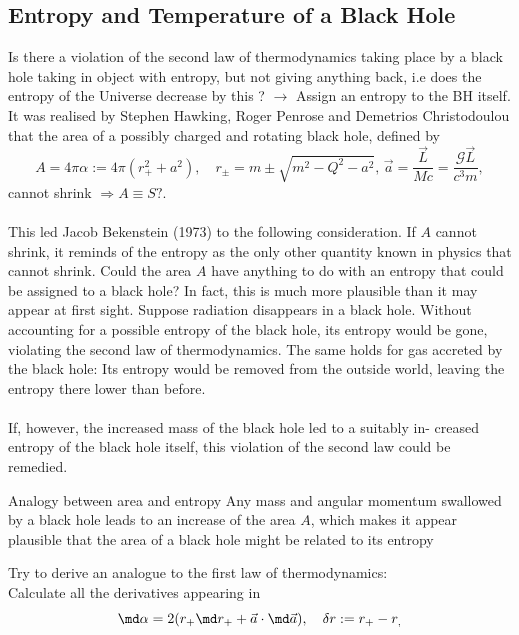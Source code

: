 	
	\newpage
	
	\subsection{Entropy and Temperature of a Black Hole}
	Is there a violation of the second law of thermodynamics taking place by a black hole taking in object with entropy, but not giving anything back, i.e does the entropy of the Universe decrease by this ? $\rightarrow$ Assign an entropy to the BH itself.\\
	It was realised by Stephen Hawking, Roger Penrose and Demetrios
	Christodoulou that the area of a possibly charged and rotating black hole,
	defined by
	\begin{equation}
		A = 4 \pi \alpha := 4 \pi (r^2_+ + a^2), \quad r_{\pm} = m \pm \sqrt{m^2-Q^2-a^2},\, \vec{a}=\frac{\vec{L}}{M c} = \frac{\mathcal{G} \vec{L}}{c^3 m},
	\end{equation}
	cannot shrink $\Rightarrow A \equiv S ?$.\\
	\\
	This led Jacob Bekenstein (1973) to the following consideration. If $A$
	cannot shrink, it reminds of the entropy as the only other quantity known
	in physics that cannot shrink. Could the area $A$ have anything to do
	with an entropy that could be assigned to a black hole? In fact, this is
	much more plausible than it may appear at first sight. Suppose radiation
	disappears in a black hole. Without accounting for a possible entropy of
	the black hole, its entropy would be gone, violating the second law of
	thermodynamics. The same holds for gas accreted by the black hole: Its
	entropy would be removed from the outside world, leaving the entropy
	there lower than before.\\
	\\
	If, however, the increased mass of the black hole led to a suitably in-
	creased entropy of the black hole itself, this violation of the second law
	could be remedied.
	\begin{mybox}{Analogy between area and entropy}
	Any mass and angular momentum swallowed by a black hole leads to
	an increase of the area $A$, which makes it appear plausible that
	the area of a black hole might be related to its entropy
	\end{mybox}
	Try to derive an analogue to the first law of thermodynamics:\\
	Calculate all the derivatives appearing in
	 \begin{equation}
	 	\md \alpha = 2 (r_+ \md r_+ + \vec{a} \cdot \md \vec{a}), \quad \delta r:= r_+ - r_,
	 \end{equation}
